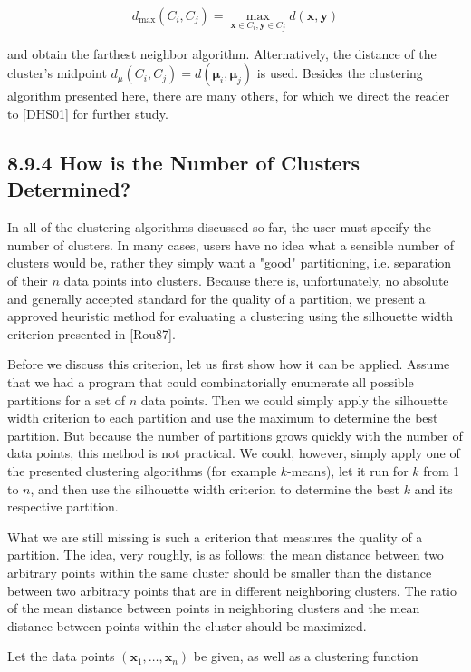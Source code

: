 \documentclass[10pt]{article}
\begin{document}
$$
d_{\max }\left(C_{i}, C_{j}\right)=\max _{\boldsymbol{x} \in C_{i}, \boldsymbol{y} \in C_{j}} d(\boldsymbol{x}, \boldsymbol{y})
$$

and obtain the farthest neighbor algorithm. Alternatively, the distance of the cluster's midpoint $d_{\mu}\left(C_{i}, C_{j}\right)=d\left(\boldsymbol{\mu}_{i}, \boldsymbol{\mu}_{j}\right)$ is used. Besides the clustering algorithm presented here, there are many others, for which we direct the reader to [DHS01] for further study.

\subsection*{8.9.4 How is the Number of Clusters Determined?}
In all of the clustering algorithms discussed so far, the user must specify the number of clusters. In many cases, users have no idea what a sensible number of clusters would be, rather they simply want a "good" partitioning, i.e. separation of their $n$ data points into clusters. Because there is, unfortunately, no absolute and generally accepted standard for the quality of a partition, we present a approved heuristic method for evaluating a clustering using the silhouette width criterion presented in [Rou87].

Before we discuss this criterion, let us first show how it can be applied. Assume that we had a program that could combinatorially enumerate all possible partitions for a set of $n$ data points. Then we could simply apply the silhouette width criterion to each partition and use the maximum to determine the best partition. But because the number of partitions grows quickly with the number of data points, this method is not practical. We could, however, simply apply one of the presented clustering algorithms (for example $k$-means), let it run for $k$ from 1 to $n$, and then use the silhouette width criterion to determine the best $k$ and its respective partition.

What we are still missing is such a criterion that measures the quality of a partition. The idea, very roughly, is as follows: the mean distance between two arbitrary points within the same cluster should be smaller than the distance between two arbitrary points that are in different neighboring clusters. The ratio of the mean distance between points in neighboring clusters and the mean distance between points within the cluster should be maximized.

Let the data points $\left(\boldsymbol{x}_{1}, \ldots, \boldsymbol{x}_{n}\right)$ be given, as well as a clustering function
\end{document}
